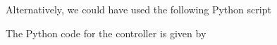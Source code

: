 Alternatively, we could have used the following Python script
%
%
%
\ifsolutionmanual

\else

\fi

The Python code for the controller is given by
%
%
%
\ifsolutionmanual

\else

\fi



